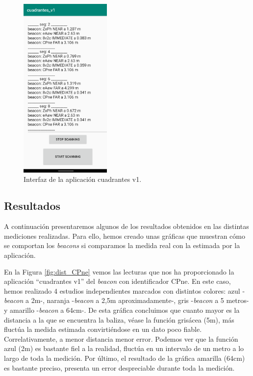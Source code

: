 \begin{figure}[t]
	\centering
	\includegraphics[width=0.4\textwidth]{Imagenes/Descripciondeltrabajo/cuadrantes_v1}
	\caption{Interfaz de la aplicación cuadrantes v1.}
	\label{fig:cuadrantesv1}
\end{figure}


\subsection{Resultados}

A continuación presentaremos algunos de los resultados obtenidos en las distintas mediciones realizadas. Para ello, hemos creado unas gráficas que muestran cómo se comportan los \textit{beacons} si comparamos la medida real con la estimada por la aplicación. 

En la Figura \ref{fig:dist_CPne} vemos las lecturas que nos ha proporcionado la aplicación ``cuadrantes v1'' del \textit{beacon} con identificador CPne. En este caso, hemos realizado 4 estudios independientes marcados con distintos colores: azul -\textit{beacon} a 2m-, naranja -\textit{beacon} a 2,5m aproximadamente-, gris -\textit{beacon} a 5 metros- y amarillo -\textit{beacon} a 64cm-. De esta gráfica concluimos que cuanto mayor es la distancia a la que se encuentra la baliza, véase la función grisácea (5m), más fluctúa la medida estimada convirtiéndose en un dato poco fiable. Correlativamente, a menor distancia menor error. Podemos ver que la función azul (2m) es bastante fiel a la realidad, fluctúa en un intervalo de un metro a lo largo de toda la medición. Por último, el resultado de la gráfica amarilla (64cm) es bastante preciso, presenta un error despreciable durante toda la medición.

